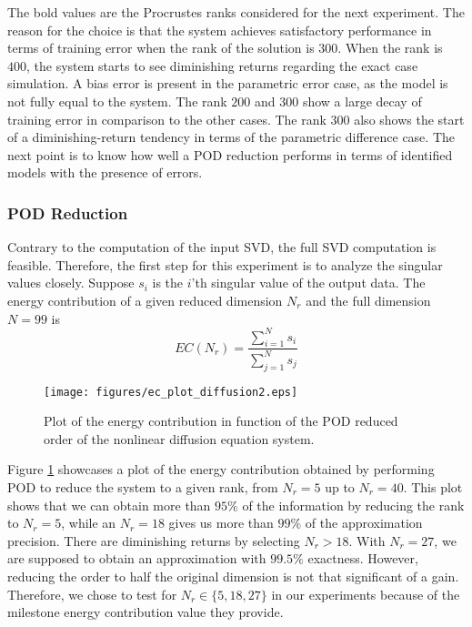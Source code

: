 The bold values are the Procrustes ranks considered for the next experiment.
%
The reason for the choice is that the system achieves satisfactory performance in terms of training error when the rank of the solution is $300$.
%
When the rank is $400$, the system starts to see diminishing returns regarding the exact case simulation.
%
A bias error is present in the parametric error case, as the model is not fully equal to the system. 
%
The rank $200$ and $300$ show a large decay of training error in comparison to the other cases.
%
The rank $300$ also shows the start of a diminishing-return tendency in terms of the parametric difference case.
%
The next point is to know how well a POD reduction performs in terms of identified models with the presence of errors.


\subsubsection{POD Reduction}

Contrary to the computation of the input SVD, the full SVD computation is feasible.
%
Therefore, the first step for this experiment is to analyze the singular values closely.
%
Suppose $s_i$ is the $i$'th singular value of the output data.
%
The energy contribution of a given reduced dimension $N_r$ and the full dimension $N = 99$ is
\begin{equation}
    EC(N_r) = \frac{\sum_{i=1}^{N}s_i}{\sum_{j=1}^{N}s_j}
\end{equation}

\begin{figure}[h]
    \centering
    \texttt{[image: figures/ec\_plot\_diffusion2.eps]}
    \caption{Plot of the energy contribution in function of the POD reduced order of the nonlinear diffusion equation system.}
    \label{fig:ec_diffusion}
\end{figure}


Figure \ref{fig:ec_diffusion} showcases a plot of the energy contribution obtained by performing POD to reduce the system to a given rank, from $N_r = 5$ up to $N_r = 40$.
%
This plot shows that we can obtain more than $95\%$ of the information by reducing the rank to $N_r = 5$, while an $N_r = 18$ gives us more than $99\%$ of the approximation precision.
%
There are diminishing returns by selecting $N_r > 18$. With $N_r = 27$, we are supposed to obtain an approximation with $99.5\%$ exactness. However, reducing the order to half the original dimension is not that significant of a gain.
%
Therefore, we chose to test for $N_r \in \{5,18,27\}$ in our experiments because of the milestone energy contribution value they provide.


